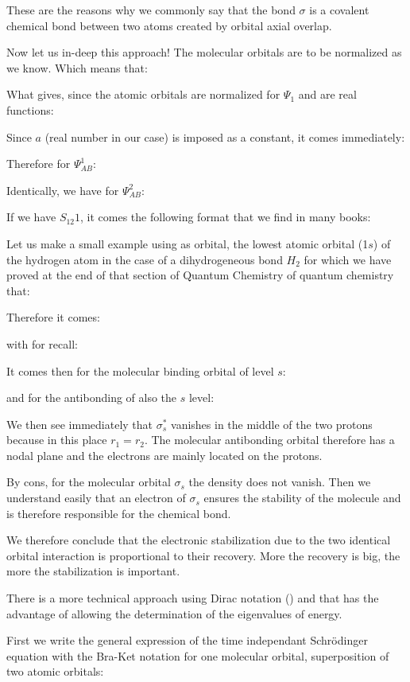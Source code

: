 	These are the reasons why we commonly say that the bond $\sigma$ is a covalent chemical bond between two atoms created by orbital axial overlap.

	Now let us in-deep this approach! The molecular orbitals are to be normalized as we know. Which means that:
	
		What gives, since the atomic orbitals are normalized for $\Psi_1$ and are real functions:
	
	Since $a$ (real number in our case) is imposed as a constant, it comes immediately:
	
	Therefore for $\Psi_{AB}^1$:
	
	Identically, we have for $\Psi_{AB}^2$:
	
	If we have $S_{12} 1$, it comes the following format that we find in many books:
	
	Let us make a small example using as orbital, the lowest atomic orbital (1$s$) of the hydrogen atom in the case of a dihydrogeneous bond $H_2$ for which we have proved at the end of that section of Quantum Chemistry of quantum chemistry that:
	
	Therefore it comes:
	
	with for recall:
	
	It comes then for the molecular binding orbital of level $s$:
	
	and for the antibonding of also the $s$ level:
	
	We then see immediately that $\sigma^*_s$ vanishes in the middle of the two protons because in this place $r_1=r_2$. The molecular antibonding orbital therefore has a nodal plane and the electrons are mainly located on the protons.
	
	By cons, for the molecular orbital $\sigma_s$ the density does not vanish. Then we understand easily that an electron of $\sigma_s$ ensures the stability of the molecule and is therefore responsible for the chemical bond.
	
	We therefore conclude that the electronic stabilization due to the two identical orbital interaction is proportional to their recovery. More the recovery is big, the more the stabilization is important.
	
	There is a more technical approach using Dirac notation () and that has the advantage of allowing the determination of the eigenvalues of energy.

	First we write the general expression of the time independant Schrödinger equation with the Bra-Ket notation for one molecular orbital, superposition of two atomic orbitals:
	
